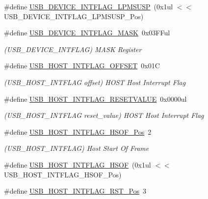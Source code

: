 \begin{DoxyCompactItemize}
\#define \mbox{\hyperlink{group___s_a_m_d21___u_s_b_ga77fe63ab463bb9bfdaf3e3bddb6a9f7e}{U\+S\+B\+\_\+\+D\+E\+V\+I\+C\+E\+\_\+\+I\+N\+T\+F\+L\+A\+G\+\_\+\+L\+P\+M\+S\+U\+SP}}~(0x1ul $<$$<$ U\+S\+B\+\_\+\+D\+E\+V\+I\+C\+E\+\_\+\+I\+N\+T\+F\+L\+A\+G\+\_\+\+L\+P\+M\+S\+U\+S\+P\+\_\+\+Pos)
\item 
\#define \mbox{\hyperlink{group___s_a_m_d21___u_s_b_ga29f9aff24b78070a6d708b7c4602b488}{U\+S\+B\+\_\+\+D\+E\+V\+I\+C\+E\+\_\+\+I\+N\+T\+F\+L\+A\+G\+\_\+\+M\+A\+SK}}~0x03\+F\+Ful
\begin{DoxyCompactList}\small\item\em (U\+S\+B\+\_\+\+D\+E\+V\+I\+C\+E\+\_\+\+I\+N\+T\+F\+L\+AG) M\+A\+SK Register \end{DoxyCompactList}\item 
\#define \mbox{\hyperlink{group___s_a_m_d21___u_s_b_ga2b6ce6969c3611175cffb2fb05ee9301}{U\+S\+B\+\_\+\+H\+O\+S\+T\+\_\+\+I\+N\+T\+F\+L\+A\+G\+\_\+\+O\+F\+F\+S\+ET}}~0x01C
\begin{DoxyCompactList}\small\item\em (U\+S\+B\+\_\+\+H\+O\+S\+T\+\_\+\+I\+N\+T\+F\+L\+AG offset) H\+O\+ST Host Interrupt Flag \end{DoxyCompactList}\item 
\#define \mbox{\hyperlink{group___s_a_m_d21___u_s_b_gaf6d8c82aa14169ff64f737cd593bc118}{U\+S\+B\+\_\+\+H\+O\+S\+T\+\_\+\+I\+N\+T\+F\+L\+A\+G\+\_\+\+R\+E\+S\+E\+T\+V\+A\+L\+UE}}~0x0000ul
\begin{DoxyCompactList}\small\item\em (U\+S\+B\+\_\+\+H\+O\+S\+T\+\_\+\+I\+N\+T\+F\+L\+AG reset\+\_\+value) H\+O\+ST Host Interrupt Flag \end{DoxyCompactList}\item 
\#define \mbox{\hyperlink{group___s_a_m_d21___u_s_b_ga757cd483097af42da10eebd928894607}{U\+S\+B\+\_\+\+H\+O\+S\+T\+\_\+\+I\+N\+T\+F\+L\+A\+G\+\_\+\+H\+S\+O\+F\+\_\+\+Pos}}~2
\begin{DoxyCompactList}\small\item\em (U\+S\+B\+\_\+\+H\+O\+S\+T\+\_\+\+I\+N\+T\+F\+L\+AG) Host Start Of Frame \end{DoxyCompactList}\item 
\#define \mbox{\hyperlink{group___s_a_m_d21___u_s_b_gaca7f095582018b037db5ba4a7ee41826}{U\+S\+B\+\_\+\+H\+O\+S\+T\+\_\+\+I\+N\+T\+F\+L\+A\+G\+\_\+\+H\+S\+OF}}~(0x1ul $<$$<$ U\+S\+B\+\_\+\+H\+O\+S\+T\+\_\+\+I\+N\+T\+F\+L\+A\+G\+\_\+\+H\+S\+O\+F\+\_\+\+Pos)
\item 
\#define \mbox{\hyperlink{group___s_a_m_d21___u_s_b_ga256557b0b79be1c833d01d891833354c}{U\+S\+B\+\_\+\+H\+O\+S\+T\+\_\+\+I\+N\+T\+F\+L\+A\+G\+\_\+\+R\+S\+T\+\_\+\+Pos}}~3

\end{DoxyCompactItemize}
